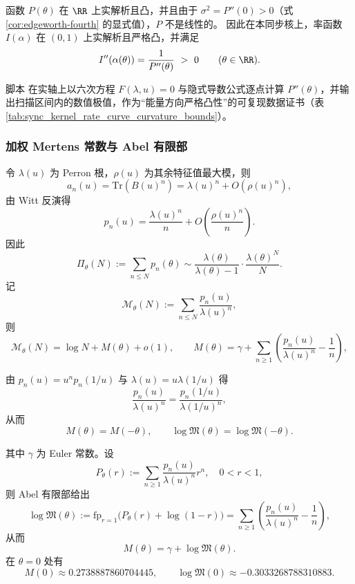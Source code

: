 \begin{proposition}\label{prop:rate-strict-convex}
函数 \(P(\theta)\) 在 \(\RR\) 上实解析且凸，并且由于 \(\sigma^2=P''(0)>0\)（式 \eqref{cor:edgeworth-fourth} 的显式值），\(P\) 不是线性的。
因此在本同步核上，率函数 \(I(\alpha)\) 在 \((0,1)\) 上实解析且严格凸，并满足
\[
I''(\alpha(\theta))=\frac{1}{P''(\theta)}\ >\ 0\qquad(\theta\in\RR).
\]
\end{proposition}
\begin{remark}\label{rem:rate-curvature-bounds}
脚本  在实轴上以六次方程 \(F(\lambda,u)=0\) 与隐式导数公式逐点计算 \(P''(\theta)\)，并输出扫描区间内的数值极值，作为“能量方向严格凸性”的可复现数据证书（表 \ref{tab:sync_kernel_rate_curve_curvature_bounds}）。
\end{remark}


\subsubsection{加权 Mertens 常数与 Abel 有限部}\label{app:mertens-weighted}
令 $\lambda(u)$ 为 Perron 根，$\rho(u)$ 为其余特征值最大模，则
\[
a_n(u)=\mathrm{Tr}(B(u)^n)=\lambda(u)^n+O(\rho(u)^n),
\]
由 Witt 反演得
\[
p_n(u)=\frac{\lambda(u)^n}{n}+O\!\left(\frac{\rho(u)^n}{n}\right).
\]
因此
\[
\Pi_\theta(N):=\sum_{n\le N}p_n(\theta)\sim \frac{\lambda(\theta)}{\lambda(\theta)-1}\cdot\frac{\lambda(\theta)^N}{N}.
\]
记
\[
\mathcal{M}_\theta(N):=\sum_{n\le N}\frac{p_n(u)}{\lambda(u)^n},
\]
则
\[
\mathcal{M}_\theta(N)=\log N+M(\theta)+o(1),
\qquad
M(\theta)=\gamma+\sum_{n\ge 1}\left(\frac{p_n(u)}{\lambda(u)^n}-\frac{1}{n}\right),
\]

\begin{proposition}\label{prop:mertens-even}
由 $p_n(u)=u^n p_n(1/u)$ 与 $\lambda(u)=u\lambda(1/u)$ 得
\[
\frac{p_n(u)}{\lambda(u)^n}=\frac{p_n(1/u)}{\lambda(1/u)^n},
\]
从而
\[
M(\theta)=M(-\theta),\qquad
\log\mathfrak{M}(\theta)=\log\mathfrak{M}(-\theta).
\]
\end{proposition}
其中 $\gamma$ 为 Euler 常数。设
\[
P_\theta(r):=\sum_{n\ge 1}\frac{p_n(u)}{\lambda(u)^n}r^n,\quad 0<r<1,
\]
则 Abel 有限部给出
\[
\log\mathfrak{M}(\theta):=\mathrm{fp}_{r=1}\bigl(P_\theta(r)+\log(1-r)\bigr)
=\sum_{n\ge 1}\left(\frac{p_n(u)}{\lambda(u)^n}-\frac{1}{n}\right),
\]
从而
\[
M(\theta)=\gamma+\log\mathfrak{M}(\theta).
\]
在 $\theta=0$ 处有
\[
M(0)\approx 0.2738887860704445,\qquad
\log\mathfrak{M}(0)\approx -0.3033268788310883.
\]
